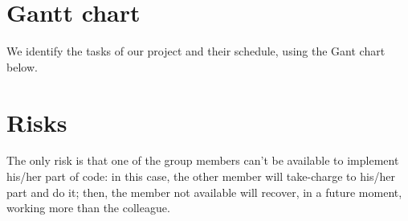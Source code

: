 \section{Gantt chart}
We identify the tasks of our project and their schedule, using the Gant chart below.
	

\section{Risks}
The only risk is that one of the group members can't be available to implement his/her part of code: in this case, the other member will take-charge to his/her part and do it; then, the member not available will recover, in a future moment, working more than the colleague.
	
